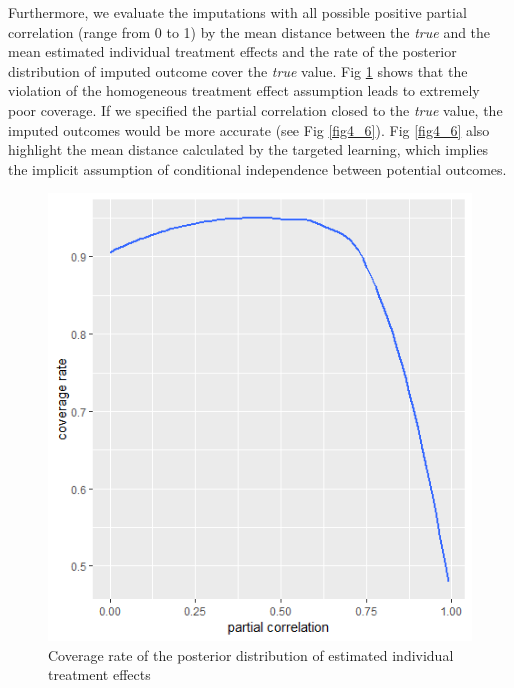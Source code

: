 	Furthermore, we evaluate the imputations with all possible positive partial correlation (range from 0 to 1) by the mean distance between the \emph{true} and the mean estimated individual treatment effects and the rate of the posterior distribution of imputed outcome cover the \emph{true} value. Fig \ref{fig4_5} shows that the violation of the homogeneous treatment effect assumption leads to extremely poor coverage. If we specified the partial correlation closed to the \emph{true} value, the imputed outcomes would be more accurate (see Fig \ref{fig4_6}). Fig \ref{fig4_6} also highlight the mean distance calculated by the targeted learning, which implies the implicit assumption of conditional independence between potential outcomes. 
	\begin{figure}[ht!]
		\centering
		\includegraphics{plots/ICE.COVER} 
		\caption{Coverage rate of the posterior distribution of estimated individual treatment effects}
		\label{fig4_5}
	\end{figure}
